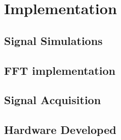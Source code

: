 \cleardoublepage
\chapter{Implementation} \label{chap:trans}
\section{Signal Simulations}
\section{FFT implementation}
\subsection{}
\section{Signal Acquisition} %
\section{Hardware Developed} %


